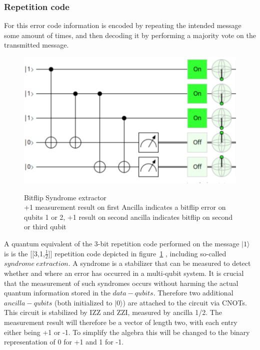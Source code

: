 \subsubsection{Repetition code}
For this error code information is encoded by repeating the 
intended message some amount of times, and then decoding it
by performing a majority vote on the transmitted message.


\begin{figure}[h!]
	\begin{center}
	\captionsetup{justification=centering,margin=2cm}
	\includegraphics[scale=0.2]{./img/bitflipSyndromeExtraction3Rep.png}\\
	\caption{Bitflip Syndrome extractor\\
        +1 measurement result on first Ancilla indicates a bitflip error
        on qubits 1 or 2, +1 result on second ancilla indicates 
		bitflip on second or third qubit}
	\label{fig: syndrome extractor}
	\end{center}
\end{figure}

A quantum equivalent of the 3-bit repetition code performed on
the message $|1\rangle$ is is the [[3,1,$\frac{1}{2}$]] repetition
code depicted in 
figure~\ref{fig: syndrome extractor}
, including so-called
$syndrome\ extraction$. A syndrome is a stabilizer that can be
measured to detect whether and where an error has occurred
in a multi-qubit system. It is crucial that the 
measurement of such syndromes occurs without harming the actual
quantum information stored in the $data-qubits$. Therefore
two additional $ancilla-qubits$ (both initialized to 
$|0\rangle$) are attached to the circuit via CNOTs.
This circuit is stabilized by IZZ and ZZI, measured by ancilla 
1/2. The measurement result will therefore be a vector of length
two, with each entry either being +1 or -1. To simplify the 
algebra this will be changed to the binary representation of 0 
for +1 and 1 for -1. 

